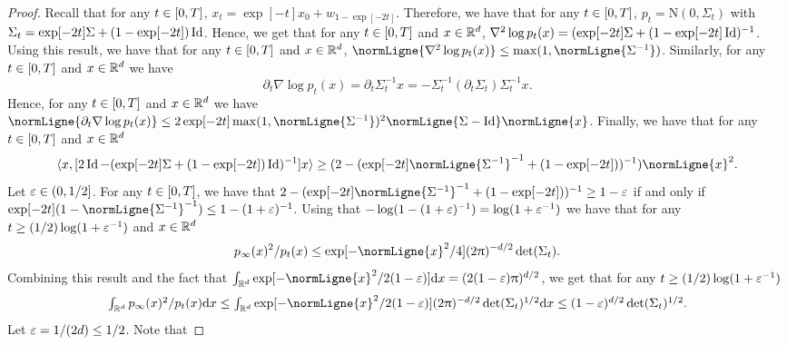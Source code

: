 \begin{proof}
  Recall that for any $t \in \left[0,T\right]$,
  $x_t = \exp[-t] x_0 + w_{1- \exp[-2t]}$. Therefore, we have that for
  any $t \in \left[0,T\right]$, $p_t = \mathrm{N}(0, \Sigma_t)$ with
  $\Sigma_t = \exp[-2t] \Sigma + (1- \exp[-2t]) \operatorname{Id}$. Hence, we get that for any
  $t \in \left[0,T\right]$ and $x \in \mathbb{R}^d$,
  $\nabla^2 \log p_t(x) = (\exp[-2t] \Sigma + (1 - \exp[-2t] \operatorname{Id})^{-1}$. Using
  this result, we have that for any $t \in \left[0,T\right]$ and $x \in \mathbb{R}^d$,
  $\normLigne{\nabla^2 \log p_t(x)} \leq \max(1, \normLigne{\Sigma^{-1}})$.  Similarly,
  for any $t \in \left[0,T\right]$ and $x \in \mathbb{R}^d$ we have
  \begin{equation}
    \partial_t \nabla \log p_t(x) = \partial_t \Sigma_t^{-1} x = - \Sigma_t^{-1} (\partial_t \Sigma_t) \Sigma_t^{-1} x  . 
  \end{equation}
  Hence, for any $t \in \left[0,T\right]$ and $x \in \mathbb{R}^d$ we have
  $\normLigne{\partial_t \nabla \log p_t(x)} \leq 2 \exp[-2 t] \max(1,
  \normLigne{\Sigma^{-1}})^2 \normLigne{\Sigma - \Id}\normLigne{x}$. Finally, we have
  that for any $t \in \left[0,T\right]$ and $x \in \mathbb{R}^d$
  \begin{equation}
   \langle x, [2 \Id - (\exp[-2t] \Sigma + (1 - \exp[-2t]) \Id)^{-1}]x \rangle \geq (2 - (\exp[-2t] \normLigne{\Sigma^{-1}}^{-1} + (1- \exp[-2t]))^{-1})\normLigne{x}^2  . 
 \end{equation}
 Let $\varepsilon \in \left(0,1/2\right]$.  For any $t \in \left[0,T\right]$, we have that
 $2 - (\exp[-2t] \normLigne{\Sigma^{-1}}^{-1} + (1- \exp[-2t]))^{-1} \geq 1 -
 \vareps$ if and only if
 $\exp[-2t](1 - \normLigne{\Sigma^{-1}}^{-1}) \leq 1 -
 (1+\vareps)^{-1}$. Using that
 $-\log(1 - (1+\varepsilon)^{-1}) = \log(1 + \varepsilon^{-1})$ we have that for any
 $t \geq (1/2) \log(1 + \varepsilon^{-1})$
 and $x \in \mathbb{R}^d$
 \begin{equation}
   p_\infty(x)^2/p_t(x) \leq \exp[-\normLigne{x}^2/4](2\uppi)^{-d/2} \det(\Sigma_t)  . 
 \end{equation}
 Combining this result and the fact that
 $\int_{\rset^d} \exp[-\normLigne{x}^2/2(1-\vareps)] \rmd x= (2(1-\vareps)
 \uppi)^{d/2}$, we get that for any 
 $t \geq (1/2) \log(1 +
 \varepsilon^{-1})$ 
 \begin{equation}
   \textstyle{
     \int_{\rset^d} p_\infty(x)^2/p_t(x) \rmd x \leq \int_{\rset^d} \exp[-\normLigne{x}^2/2(1-\vareps)](2\uppi)^{-d/2} \det(\Sigma_t)^{1/2}  \rmd x \leq (1-\vareps)^{d/2} \det(\Sigma_t)^{1/2} .
     }
   \end{equation}
   Let $\varepsilon = 1/(2d) \leq 1/2$. Note that

\end{proof}
